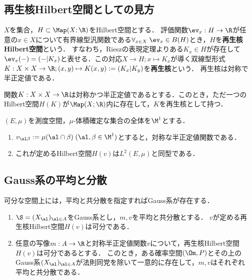 \documentclass[uplatex,dvipdfmx]{jsreport}
\begin{document}
\subsection{再生核Hilbert空間としての見方}

\begin{definition}
    $X$を集合，$H\subset\Map(X;\R)$をHilbert空間とする．
    評価関数$\ev_x:H\to\R$が任意の$x\in X$について有界線型汎関数である$\forall_{x\in X}\;\ev_x\in B(H)$とき，$H$を\textbf{再生核Hilbert空間}という．
    すなわち，Rieszの表現定理よりある$K_x\in H$が存在して$\ev_x(-)=(-|K_x)$と表せる．この対応$X\to H;x\mapsto K_x$が導く双線型形式$K:X\times X\to\R;(x,y)\mapsto K(x,y):=(K_x|K_y)$を\textbf{再生核}という．
    再生核は対称で半正定値である．
\end{definition}
\begin{theorem}
    関数$K:X\times X\to\R$は対称かつ半正定値であるとする．このとき，ただ一つのHilbert空間$H(K)$が$\Map(X;\R)$内に存在して，$K$を再生核として持つ．
\end{theorem}

\begin{theorem}
    $(E,\mu)$を測度空間，$\mu$-体積確定な集合の全体を$\M^1$とする．
    \begin{enumerate}
        \item $v_{\al\beta}:=\mu(\al\cap\beta)\;(\al,\beta\in\M^1)$とすると，対称な半正定値関数である．
        \item これが定めるHilbert空間$H(v)$は$L^2(E,\mu)$と同型である．
    \end{enumerate}
\end{theorem}

\subsection{Gauss系の平均と分散}

\begin{tcolorbox}[colframe=ForestGreen, colback=ForestGreen!10!white,breakable,colbacktitle=ForestGreen!40!white,coltitle=black,fonttitle=\bfseries\sffamily,
title=]
    可分な空間上には，平均と共分散を指定すればGauss系が存在する．
\end{tcolorbox}

\begin{theorem}\mbox{}
    \begin{enumerate}
        \item $\S=(X_\al)_{\al\in A}$をGauss系とし，$m,v$を平均と共分散とする．
        $v$が定める再生核Hilbert空間$H(v)$は可分である．
        \item 任意の写像$m:A\to\R$と対称半正定値関数$v$について，再生核Hilbert空間$H(v)$は可分であるとする．
        このとき，ある確率空間$(\Om,P)$とその上のGauss系$(X_\al)_{\al\in A}$が法則同党を除いて一意的に存在して，$m,v$はそれぞれ平均と共分散である．
    \end{enumerate}
\end{theorem}
\end{document}
